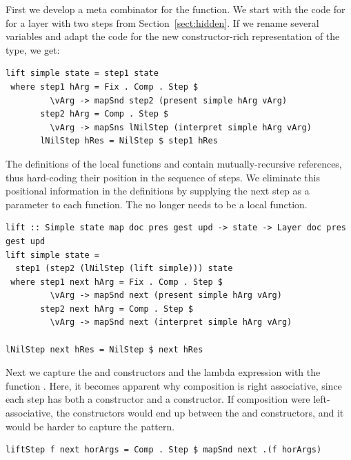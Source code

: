 \documentclass{llncs}
\begin{document}
First we develop a meta combinator for the  function. We start with the code for  for a layer with two steps from Section~\ref{sect:hidden}. If we rename several variables and adapt the code for the new constructor-rich representation of the  type, we get:


\begin{small} %
\begin{verbatim}
lift simple state = step1 state 
 where step1 hArg = Fix . Comp . Step $
         \vArg -> mapSnd step2 (present simple hArg vArg)
       step2 hArg = Comp . Step $
         \vArg -> mapSns lNilStep (interpret simple hArg vArg)
       lNilStep hRes = NilStep $ step1 hRes
\end{verbatim}%
\end{small}

The definitions of the local functions  and  contain mutually-recursive references, thus hard-coding their position in the sequence of steps. We eliminate this positional information in the definitions by supplying the next step as a parameter to each function. The  no longer needs to be a local function.

     
\begin{small} %
\begin{verbatim}
lift :: Simple state map doc pres gest upd -> state -> Layer doc pres gest upd
lift simple state =  
  step1 (step2 (lNilStep (lift simple))) state
 where step1 next hArg = Fix . Comp . Step $
         \vArg -> mapSnd next (present simple hArg vArg)
       step2 next hArg = Comp . Step $
         \vArg -> mapSnd next (interpret simple hArg vArg)

lNilStep next hRes = NilStep $ next hRes
\end{verbatim}%
\end{small}

Next we  capture the  and  constructors and the lambda expression with the function . Here, it becomes apparent why composition is right associative, since each step has both a constructor and a  constructor. If composition were left-associative, the  constructors would end up between the  and  constructors, and it would be harder to capture the pattern.

\begin{small} %
\begin{verbatim}
liftStep f next horArgs = Comp . Step $ mapSnd next .(f horArgs)
\end{verbatim}%
\end{small}
\end{document}
